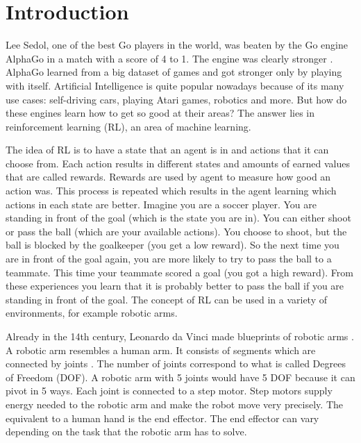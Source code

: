 \chapter{Introduction}



Lee Sedol, one of the best Go players in the world, was beaten by the Go engine AlphaGo in a match with a score of 4 to 1. The engine was clearly stronger \cite{leesedol}.  
AlphaGo learned from a big dataset of games and got stronger only by playing with itself. 
Artificial Intelligence is quite popular nowadays because of its many use cases: self-driving cars, playing Atari games, robotics and more. 
But how do these engines learn how to get so good at their areas? The answer lies in reinforcement learning (RL), an area of machine learning. 

\vspace{0.5cm}

The idea of RL is to have a state that an agent is in and actions that it can choose from. Each action results in different states and amounts of earned values that are called rewards. Rewards are used by agent to measure how good an action was. This process is repeated which results in the agent learning which actions in each state are better.
Imagine you are a soccer player. You are standing in front of the goal (which is the state you are in). You can either shoot or pass the ball (which are your available actions). You choose to shoot, but the ball is blocked by the goalkeeper (you get a low reward). So the next time you are in front of the goal again, you are more likely to try to pass the ball to a teammate. This time your teammate scored a goal (you got a high reward). From these experiences you learn that it is probably better to pass the ball if you are standing in front of the goal.
The concept of RL can be used in a variety of environments, for example robotic arms.

\vspace{0.5cm}

Already in the 14th century, Leonardo da Vinci made blueprints of robotic arms \cite{roboarmhistory}.
A robotic arm resembles a human arm. It consists of segments which are connected by joints \cite{howroboarmworks}.
The number of joints correspond to what is called Degrees of Freedom (DOF). A robotic arm with 5 joints would have 5 DOF because it can pivot in 5 ways. Each joint is connected to a step motor. Step motors supply energy needed to the robotic arm and make the robot move very precisely.
The equivalent to a human hand is the end effector. The end effector can vary depending on the task that the robotic arm has to solve.  

